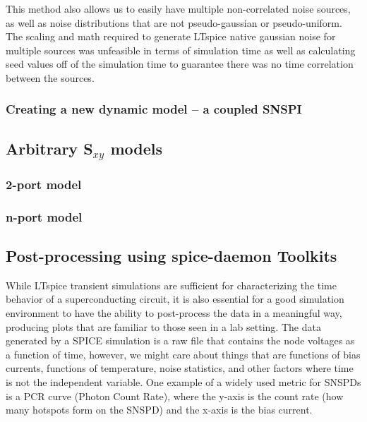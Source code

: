 \documentclass{article}
\newcommand{\todofig}[2][]{\todo[color=red!40, #1]{\textbf{add fig:}\\#2}}
\begin{document}
This method also allows us to easily have multiple non-correlated noise sources, as well as noise 
distributions that are not pseudo-gaussian or pseudo-uniform. The scaling and math required to generate
LTspice native gaussian noise for multiple sources was unfeasible in terms of simulation time as well
as calculating seed values off of the simulation time to guarantee there was no time correlation between
the sources.

\todofig[]{noise example}


\subsubsection{Creating a new dynamic model -- a coupled SNSPI}




\subsection{Arbitrary S$_{xy}$ models}


\subsubsection{2-port model}


\subsubsection{n-port model}


\subsection{Post-processing using spice-daemon Toolkits}

While LTspice transient simulations are sufficient for characterizing the time behavior of a superconducting 
circuit, it is also essential for a good simulation environment to have the ability to post-process the data 
in a meaningful way, producing plots that are familiar to those seen in a lab setting.
The data generated by a SPICE simulation is a raw file
that contains the node voltages as a function of time, however, we might care about things that are functions
of bias currents, functions of temperature, noise statistics, and other factors where time is not the
independent variable. One example of a widely used metric for SNSPDs is a PCR curve (Photon Count Rate), where
the y-axis is the count rate (how many hotspots form on the SNSPD) and the x-axis is the bias current.
\end{document}
